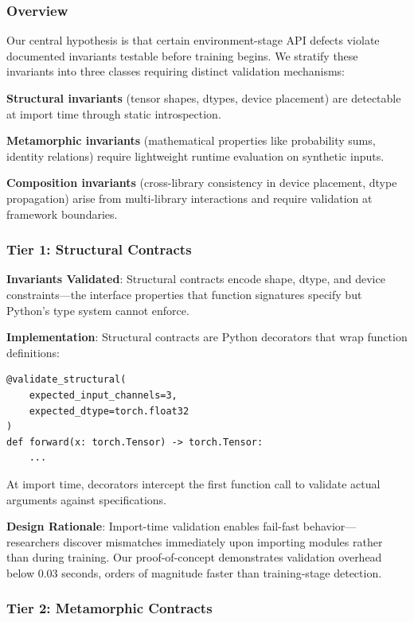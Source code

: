
\subsubsection{Overview}

Our central hypothesis is that certain environment-stage API defects violate documented invariants testable before training begins. We stratify these invariants into three classes requiring distinct validation mechanisms:

\textbf{Structural invariants} (tensor shapes, dtypes, device placement) are detectable at import time through static introspection.

\textbf{Metamorphic invariants} (mathematical properties like probability sums, identity relations) require lightweight runtime evaluation on synthetic inputs.

\textbf{Composition invariants} (cross-library consistency in device placement, dtype propagation) arise from multi-library interactions and require validation at framework boundaries.

\subsubsection{Tier 1: Structural Contracts}

\textbf{Invariants Validated}: Structural contracts encode shape, dtype, and device constraints---the interface properties that function signatures specify but Python's type system cannot enforce.

\textbf{Implementation}: Structural contracts are Python decorators that wrap function definitions:

\begin{verbatim}
@validate_structural(
    expected_input_channels=3,
    expected_dtype=torch.float32
)
def forward(x: torch.Tensor) -> torch.Tensor:
    ...
\end{verbatim}

At import time, decorators intercept the first function call to validate actual arguments against specifications.

\textbf{Design Rationale}: Import-time validation enables fail-fast behavior---researchers discover mismatches immediately upon importing modules rather than during training. Our proof-of-concept demonstrates validation overhead below 0.03 seconds, orders of magnitude faster than training-stage detection.

\subsubsection{Tier 2: Metamorphic Contracts}

